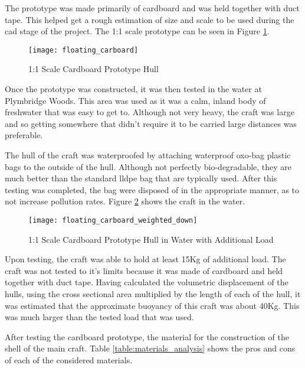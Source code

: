 \documentclass [11pt]{article}
\begin{document}
The prototype was made primarily of cardboard and was held together with duct tape. This helped get a rough estimation of size and scale to be used during the \gls{cad} stage of the project. The 1:1 scale prototype can be seen in Figure \ref{fig:floating_carboard}.

\begin{figure}[H]
\centerline{\texttt{[image: floating\_carboard]}}
\caption{1:1 Scale Cardboard Prototype Hull}
\label{fig:floating_carboard}
\end{figure}

Once the prototype was constructed, it was then tested in the water at Plymbridge Woods. This area was used as it was a calm, inland body of freshwater that was easy to get to. Although not very heavy, the craft was large and so getting somewhere that didn't require it to be carried large distances was preferable. 

The hull of the craft was waterproofed by attaching waterproof \gls{oxo-bag} plastic bags to the outside of the hull. Although not perfectly bio-degradable, they are much better than the standard \gls{lldpe} bag that are typically used. After this testing was completed, the bag were disposed of in the appropriate manner, as to not increase pollution rates. Figure \ref{fig:floating_carboard_weighted_down} shows the craft in the water.

\begin{figure}[H]
\centerline{\texttt{[image: floating\_carboard\_weighted\_down]}}
\caption{1:1 Scale Cardboard Prototype Hull in Water with Additional Load}
\label{fig:floating_carboard_weighted_down}
\end{figure}

Upon testing, the craft was able to hold at least 15Kg of additional load. The craft was not tested to it's limits because it was made of cardboard and held together with duct tape. Having calculated the volumetric displacement of the hulls, using the cross sectional area multiplied by the length of each of the hull, it was estimated that the approximate buoyancy of this craft was about 40Kg. This was much larger than the tested load that was used. 

After testing the cardboard prototype, the material for the construction of the shell of the main craft. Table \ref{table:materials_analysis} shows the pros and cons of each of the considered materials.  
\end{document}
